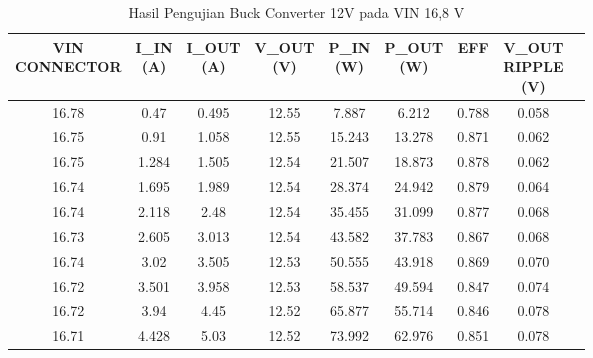 \begin{table}[h!]
\centering
\caption{Hasil Pengujian Buck Converter 12V pada VIN 16,8 V}
\label{tab:buck12v_16v_no_vin}
\begin{tabular}{ccccccccc}
\hline
\makecell{VIN\\CONNECTOR} & \makecell{I\_IN\\(A)} & \makecell{I\_OUT\\(A)} & \makecell{V\_OUT\\(V)} & \makecell{P\_IN\\(W)} & \makecell{P\_OUT\\(W)} & EFF & \makecell{V\_OUT\\RIPPLE\\(V)} \\
\hline
16.78 & 0.47 & 0.495 & 12.55 & 7.887 & 6.212 & 0.788 & 0.058 \\
16.75 & 0.91 & 1.058 & 12.55 & 15.243 & 13.278 & 0.871 & 0.062 \\
16.75 & 1.284 & 1.505 & 12.54 & 21.507 & 18.873 & 0.878 & 0.062 \\
16.74 & 1.695 & 1.989 & 12.54 & 28.374 & 24.942 & 0.879 & 0.064 \\
16.74 & 2.118 & 2.48 & 12.54 & 35.455 & 31.099 & 0.877 & 0.068 \\
16.73 & 2.605 & 3.013 & 12.54 & 43.582 & 37.783 & 0.867 & 0.068 \\
16.74 & 3.02 & 3.505 & 12.53 & 50.555 & 43.918 & 0.869 & 0.070 \\
16.72 & 3.501 & 3.958 & 12.53 & 58.537 & 49.594 & 0.847 & 0.074 \\
16.72 & 3.94 & 4.45 & 12.52 & 65.877 & 55.714 & 0.846 & 0.078 \\
16.71 & 4.428 & 5.03 & 12.52 & 73.992 & 62.976 & 0.851 & 0.078 \\
\hline
\end{tabular}
\end{table}
